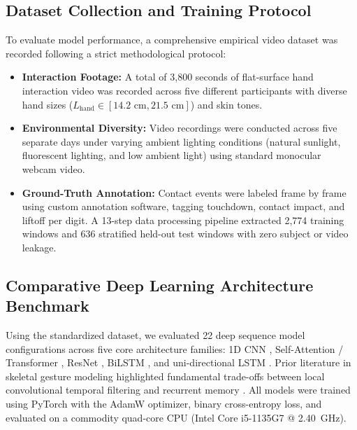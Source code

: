 \documentclass[conference]{IEEEtran}
\begin{document}
\subsection{Dataset Collection and Training Protocol}
To evaluate model performance, a comprehensive empirical video dataset was recorded following a strict methodological protocol:
\begin{itemize}
    \item \textbf{Interaction Footage:} A total of 3,800 seconds of flat-surface hand interaction video was recorded across five different participants with diverse hand sizes ($L_{\text{hand}} \in [14.2\text{ cm}, 21.5\text{ cm}]$) and skin tones.
    \item \textbf{Environmental Diversity:} Video recordings were conducted across five separate days under varying ambient lighting conditions (natural sunlight, fluorescent lighting, and low ambient light) using standard monocular webcam video.
    \item \textbf{Ground-Truth Annotation:} Contact events were labeled frame by frame using custom annotation software, tagging touchdown, contact impact, and liftoff per digit. A 13-step data processing pipeline extracted 2,774 training windows and 636 stratified held-out test windows with zero subject or video leakage.
\end{itemize}

\subsection{Comparative Deep Learning Architecture Benchmark}
Using the standardized dataset, we evaluated 22 deep sequence model configurations across five core architecture families: 1D CNN \cite{Lai2018CNN, Li2021CNN, Nunez2018Convolutional}, Self-Attention / Transformer \cite{Cui2020Deep}, ResNet \cite{Cui2020Deep}, BiLSTM \cite{Hochreiter1997LSTM}, and uni-directional LSTM \cite{Doan2022Efficient, Ikram2020Skeleton}. Prior literature in skeletal gesture modeling highlighted fundamental trade-offs between local convolutional temporal filtering and recurrent memory \cite{Ikram2020Skeleton, Nunez2018Convolutional}. All models were trained using PyTorch with the AdamW optimizer, binary cross-entropy loss, and evaluated on a commodity quad-core CPU (Intel Core i5-1135G7 @ 2.40~GHz).
\end{document}

